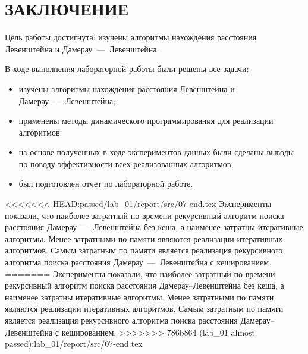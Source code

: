 \section*{ЗАКЛЮЧЕНИЕ}

Цель работы достигнута: изучены алгоритмы нахождения расстояния Левенштейна и Дамерау~---~Левенштейна.

В ходе выполнения лабораторной работы были решены все задачи:
\begin{itemize}
	\item изучены алгоритмы нахождения расстояния Левенштейна и Дамерау~---~Левенштейна;
	\item применены методы динамического программирования для реализации алгоритмов;
	\item на основе полученных в ходе экспериментов данных были сделаны выводы по поводу эффективности всех реализованных алгоритмов;
	\item был подготовлен отчет по лабораторной работе.
\end{itemize}

<<<<<<< HEAD:passed/lab_01/report/src/07-end.tex
Эксперименты показали, что наиболее затратный по времени рекурсивный алгоритм поиска расстояния Дамерау~---~Левенштейна без кеша, а наименее затратны итеративные алгоритмы. Менее затратными по памяти являются реализации итеративных алгоритмов. 
Самым затратным по памяти является реализация рекурсивного алгоритма поиска расстояния Дамерау~---~Левенштейна с кешированием. 
=======
Эксперименты показали, что наиболее затратный по времени рекурсивный алгоритм поиска расстояния Дамерау--Левенштейна без кеша, а наименее затратны итеративные алгоритмы. Менее затратными по памяти являются реализации итеративных алгоритмов. 
Самым затратным по памяти является реализация рекурсивного алгоритма поиска расстояния Дамерау--Левенштейна с кешированием. 
>>>>>>> 786b864 (lab_01 almost passed):lab_01/report/src/07-end.tex
